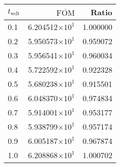 \begin{tabular}{lrr}
\toprule
$t_{\mathrm{wdt}}$ & $\overline{\mathrm{FOM}}$ &    Ratio \\
\midrule
               0.1 &   6.204512$\times 10^{1}$ & 1.000000 \\
               0.2 &   5.950573$\times 10^{1}$ & 0.959072 \\
               0.3 &   5.956541$\times 10^{1}$ & 0.960034 \\
               0.4 &   5.722592$\times 10^{1}$ & 0.922328 \\
               0.5 &   5.680238$\times 10^{1}$ & 0.915501 \\
               0.6 &   6.048370$\times 10^{1}$ & 0.974834 \\
               0.7 &   5.914001$\times 10^{1}$ & 0.953177 \\
               0.8 &   5.938799$\times 10^{1}$ & 0.957174 \\
               0.9 &   6.005187$\times 10^{1}$ & 0.967874 \\
               1.0 &   6.208868$\times 10^{1}$ & 1.000702 \\
\bottomrule
\end{tabular}
